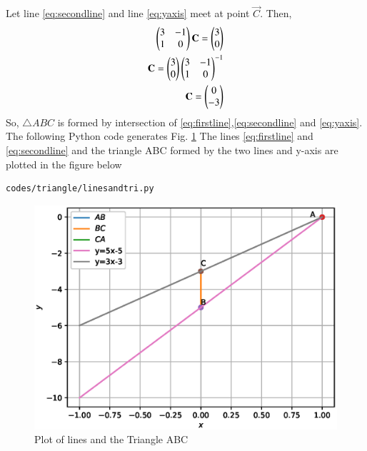 \begin{enumerate}[label=\thesection.\arabic*.,ref=\thesection.\theenumi]
Let line \ref{eq:secondline} and  line \ref{eq:yaxis} meet at point $\vec{C}$. Then, 
\begin{align}
\begin{pmatrix}3&-1\\1&0\end{pmatrix}\mathbf{C} =\begin{pmatrix}3\\0\end{pmatrix}
\\
\mathbf{C}=\begin{pmatrix}3\\0\end{pmatrix}{\ensuremath{\begin{pmatrix}3&-1\\1&0\end{pmatrix}}}^{-1}
\\
\mathbf{C}=\begin{pmatrix}0\\-3\end{pmatrix}
\end{align}
So, $\triangle ABC$ is formed by intersection of \ref{eq:firstline},\ref{eq:secondline} and \ref{eq:yaxis}. The  following Python code generates Fig. \ref{fig:tri_py}
%
The lines \ref{eq:firstline} and \ref{eq:secondline} and the triangle ABC formed by the two lines and y-axis are plotted in the figure below
\begin{lstlisting}
codes/triangle/linesandtri.py
\end{lstlisting}
\begin{figure}[!ht]
\centering
\includegraphics[width=\columnwidth]{./codes/triangle/pyfigs/triangle.eps}
\caption{Plot of lines and the Triangle ABC }
\label{fig:tri_py}
\end{figure}

\end{enumerate}
